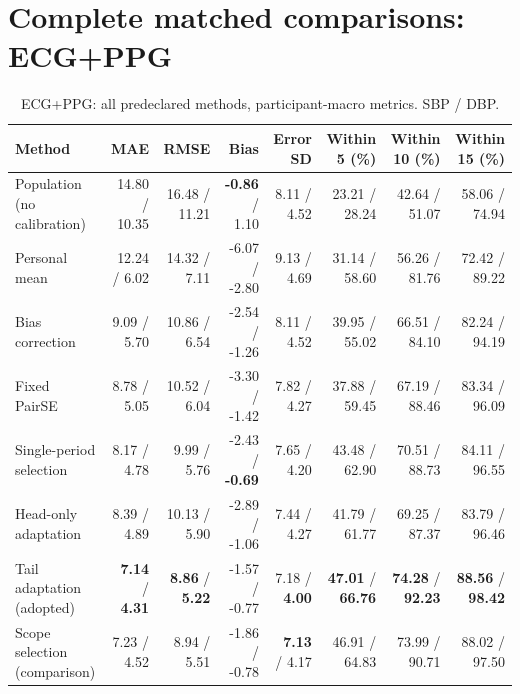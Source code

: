 \documentclass[conference]{IEEEtran}
\begin{document}
\clearpage
\section*{Complete matched comparisons: ECG+PPG}
\begin{table}[!ht]\centering\scriptsize\caption{ECG+PPG: all predeclared methods, participant-macro metrics. SBP / DBP.}
\begin{tabular}{lrrrrrrr}\toprule Method & MAE & RMSE & Bias & Error SD & Within 5 (\%) & Within 10 (\%) & Within 15 (\%)\\\midrule
Population (no calibration) & 14.80 / 10.35 & 16.48 / 11.21 & \textbf{-0.86} / 1.10 & 8.11 / 4.52 & 23.21 / 28.24 & 42.64 / 51.07 & 58.06 / 74.94\\
Personal mean & 12.24 / 6.02 & 14.32 / 7.11 & -6.07 / -2.80 & 9.13 / 4.69 & 31.14 / 58.60 & 56.26 / 81.76 & 72.42 / 89.22\\
Bias correction & 9.09 / 5.70 & 10.86 / 6.54 & -2.54 / -1.26 & 8.11 / 4.52 & 39.95 / 55.02 & 66.51 / 84.10 & 82.24 / 94.19\\
Fixed PairSE & 8.78 / 5.05 & 10.52 / 6.04 & -3.30 / -1.42 & 7.82 / 4.27 & 37.88 / 59.45 & 67.19 / 88.46 & 83.34 / 96.09\\
Single-period selection & 8.17 / 4.78 & 9.99 / 5.76 & -2.43 / \textbf{-0.69} & 7.65 / 4.20 & 43.48 / 62.90 & 70.51 / 88.73 & 84.11 / 96.55\\
Head-only adaptation & 8.39 / 4.89 & 10.13 / 5.90 & -2.89 / -1.06 & 7.44 / 4.27 & 41.79 / 61.77 & 69.25 / 87.37 & 83.79 / 96.46\\
Tail adaptation (adopted) & \textbf{7.14} / \textbf{4.31} & \textbf{8.86} / \textbf{5.22} & -1.57 / -0.77 & 7.18 / \textbf{4.00} & \textbf{47.01} / \textbf{66.76} & \textbf{74.28} / \textbf{92.23} & \textbf{88.56} / \textbf{98.42}\\
Scope selection (comparison) & 7.23 / 4.52 & 8.94 / 5.51 & -1.86 / -0.78 & \textbf{7.13} / 4.17 & 46.91 / 64.83 & 73.99 / 90.71 & 88.02 / 97.50\\
\bottomrule\end{tabular}\end{table}
\end{document}
